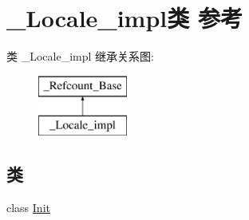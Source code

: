 \hypertarget{class___locale__impl}{}\section{\+\_\+\+Locale\+\_\+impl类 参考}
\label{class___locale__impl}
类 \+\_\+\+Locale\+\_\+impl 继承关系图\+:\begin{figure}[H]
\begin{center}
\leavevmode
\includegraphics[height=2.000000cm]{class___locale__impl}
\end{center}
\end{figure}
\subsection*{类}
\begin{DoxyCompactItemize}
\item 
class \hyperlink{class___locale__impl_1_1_init}{Init}
\end{DoxyCompactItemize}
